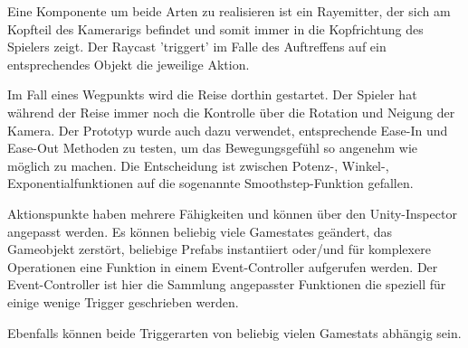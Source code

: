 Eine Komponente um beide Arten zu realisieren ist ein Rayemitter, der sich am Kopfteil des Kamerarigs befindet und somit immer in die Kopfrichtung des Spielers zeigt. Der Raycast 'triggert' im Falle des Auftreffens auf ein entsprechendes Objekt die jeweilige Aktion.

Im Fall eines Wegpunkts wird die Reise dorthin gestartet. Der Spieler hat während der Reise immer noch die Kontrolle über die Rotation und Neigung der Kamera. Der Prototyp wurde auch dazu verwendet, entsprechende Ease-In und Ease-Out Methoden zu testen, um das Bewegungsgefühl so angenehm wie möglich zu machen.
Die Entscheidung ist zwischen Potenz-, Winkel-, Exponentialfunktionen auf die sogenannte Smoothstep-Funktion gefallen.

Aktionspunkte haben mehrere Fähigkeiten und können über den Unity-Inspector angepasst werden. Es können beliebig viele Gamestates geändert, das Gameobjekt zerstört, beliebige Prefabs instantiiert oder/und für komplexere Operationen eine Funktion in einem Event-Controller aufgerufen werden. Der Event-Controller ist hier die Sammlung angepasster Funktionen die speziell für einige wenige Trigger geschrieben werden.

Ebenfalls können beide Triggerarten von beliebig vielen Gamestats abhängig sein.
